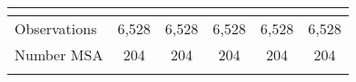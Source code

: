 \begin{tabular}{lccccc}
    \vspace{4pt} & \begin{footnotesize}\end{footnotesize} & \begin{footnotesize}\end{footnotesize} & \begin{footnotesize}\end{footnotesize} & \begin{footnotesize}\end{footnotesize} & \begin{footnotesize}\end{footnotesize} \\
     \hline
    
    Observations & 6,528 & 6,528 & 6,528 & 6,528 & 6,528 \\
    Number MSA & 204 & 204 & 204 & 204 & 204 \\
    \vspace{-2pt} & \vspace{-2pt} & \vspace{-2pt} & \vspace{-2pt} \\
     \hline
    
    \end{tabular}
   
    